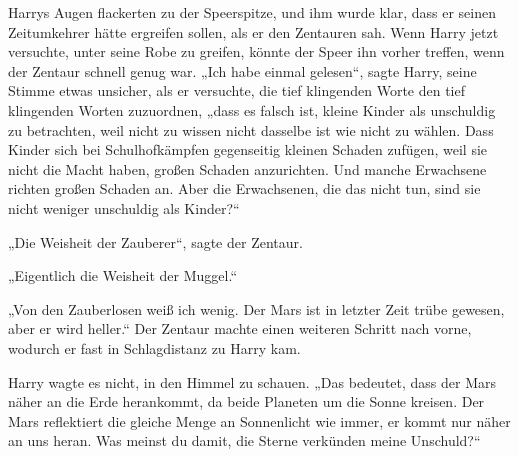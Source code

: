 Harrys Augen flackerten zu der Speerspitze, und ihm wurde klar, dass er seinen Zeitumkehrer hätte ergreifen sollen, als er den Zentauren sah. Wenn Harry jetzt versuchte, unter seine Robe zu greifen, könnte der Speer ihn vorher treffen, wenn der Zentaur schnell genug war.
„Ich habe einmal gelesen“, sagte Harry, seine Stimme etwas unsicher, als er versuchte, die tief klingenden Worte den tief klingenden Worten zuzuordnen,
„dass es falsch ist, kleine Kinder als unschuldig zu betrachten, weil nicht zu wissen nicht dasselbe ist wie nicht zu wählen. Dass Kinder sich bei Schulhofkämpfen gegenseitig kleinen Schaden zufügen, weil sie nicht die Macht haben, großen Schaden anzurichten. Und manche Erwachsene richten großen Schaden an. Aber die Erwachsenen, die das nicht tun, sind sie nicht weniger unschuldig als Kinder?“

„Die Weisheit der Zauberer“, sagte der Zentaur.

„Eigentlich die Weisheit der Muggel.“

„Von den Zauberlosen weiß ich wenig. Der Mars ist in letzter Zeit trübe gewesen, aber er wird heller.“ Der Zentaur machte einen weiteren Schritt nach vorne, wodurch er fast in Schlagdistanz zu Harry kam.

Harry wagte es nicht, in den Himmel zu schauen.
„Das bedeutet, dass der Mars näher an die Erde herankommt, da beide Planeten um die Sonne kreisen. Der Mars reflektiert die gleiche Menge an Sonnenlicht wie immer, er kommt nur näher an uns heran. Was meinst du damit, die Sterne verkünden meine Unschuld?“

